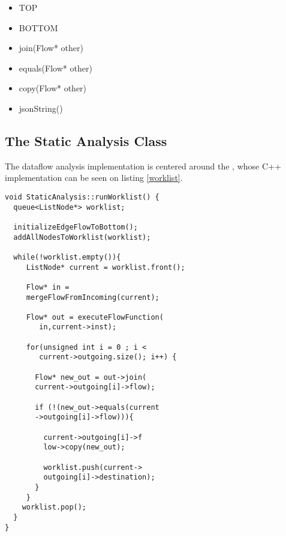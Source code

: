 \begin{itemize}
\item TOP
\item BOTTOM
\item join(Flow* other)
\item equals(Flow* other)
\item copy(Flow* other)
\item jsonString()
\end{itemize}


\subsection{The Static Analysis Class}

The dataflow analysis implementation is centered around the , whose C++ implementation can be seen on listing \ref{worklist}.

\begin{lstlisting}[caption=Worklist Algorithm, label=worklist]
void StaticAnalysis::runWorklist() {
  queue<ListNode*> worklist;
  
  initializeEdgeFlowToBottom();
  addAllNodesToWorklist(worklist);
  
  while(!worklist.empty()){
     ListNode* current = worklist.front();
     
     Flow* in = 
     mergeFlowFromIncoming(current);
     
     Flow* out = executeFlowFunction(
     	in,current->inst);
     
     for(unsigned int i = 0 ; i < 
     	current->outgoing.size(); i++) {
       
       Flow* new_out = out->join(
       current->outgoing[i]->flow);
     
       if (!(new_out->equals(current
       ->outgoing[i]->flow))){
     
         current->outgoing[i]->f
         low->copy(new_out);
     
         worklist.push(current->
         outgoing[i]->destination);
       }
     }
    worklist.pop();
  }
}
\end{lstlisting}
